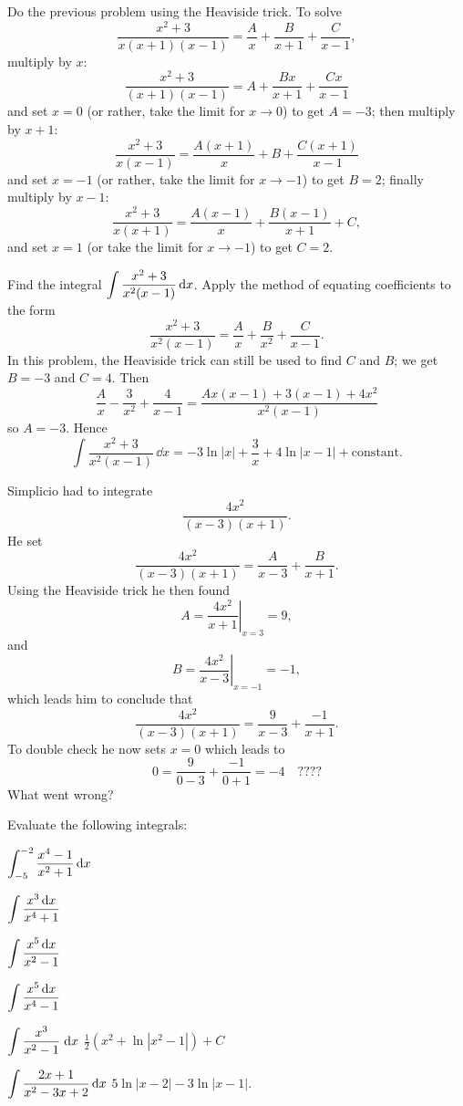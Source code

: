 \begin{multicols}{2}
\problem Do the previous problem using the Heaviside trick. %
\answer %
To solve
\[
\frac{x^2+3}{x(x+1)(x-1)} =
\frac{A}{x}+\frac{B}{x+1}+\frac{C}{x-1},
\]
multiply by $x$:
\[
\frac{x^2+3}{(x+1)(x-1)} = A+\frac{Bx}{x+1}+\frac{Cx}{x-1}
\]
and set $x=0$ (or rather, take the limit for $x\to0$)  to get $A=-3$; then multiply by $x+1$:
\[
\frac{x^2+3}{x(x-1)} = \frac{A(x+1)}{x}+B+\frac{C(x+1)}{x-1}
\]
and set $x=-1$
(or rather, take the limit for $x\to-1$) to get $B=2$; finally multiply by $x-1$:
\[
\frac{x^2+3}{x(x+1)} = \frac{A(x-1)}{x}+\frac{B(x-1)}{x+1}+ C,
\]
and set $x=1$ (or take the limit for $x\to-1$) to get $C=2$.
\endanswer

\problem\label{pblm:part-fracs-genrl} Find the integral $\DS %
\int\frac{x^2+3}{x^2(x-1)}\,\dd x$.
\answer %
Apply the method of equating coefficients to the form
\[
\frac{x^2+3}{x^2(x-1)}= \frac{A}{x}+\frac{B}{x^2}+\frac{C}{x-1}.
\]
In this problem, the Heaviside trick can still be used to find $C$
and $B$; we get $B=-3$ and $C=4$. Then
\[
\frac{A}{x}-\frac{3}{x^2}+\frac{4}{x-1}
=\frac{Ax(x-1)+3(x-1)+4x^2}{x^2(x-1)}
\]
so $A=-3$. Hence
\[
\int\frac{x^2+3}{x^2(x-1)}\,\dd x =-3\ln|x| +\frac{3}{x} +
4\ln|x-1| + \text{constant}.
\]
\endanswer

\problem Simplicio had to integrate %
\[
  \frac{4x^2}{(x-3)(x+1)}.
\]
He set
\[
\frac{4x^2}{(x-3)(x+1)} = \frac{A}{x-3} + \frac{B}{x+1}.
\]
Using the Heaviside trick he then found
\[
A = \left.\frac{4x^2}{x+1}\right|_{x=3} = 9,
\]
and 
\[
B =  \left.\frac{4x^2}{x-3}\right|_{x=-1} = -1,
\]
which leads him to conclude that 
\[
\frac{4x^2}{(x-3)(x+1)} = \frac{9}{x-3} + \frac{-1}{x+1}.
\]
To double check he now sets $x=0$ which leads to
\[
0 = \frac{9}{0-3} + \frac{-1}{0+1} = -4 \quad  ????
\]
What went wrong?


\begin{center}
  \textcolor{badgerred}{Evaluate the following integrals:}
\end{center}

\problem $\displaystyle \int^{-2}_{-5} \frac{x^4-1}{ x^2+1} \,\mathrm{d} x$ %

\problem $\displaystyle \int \frac{x^3\,\mathrm{d} x}{x^4+1}$ %

\problem $\displaystyle \int \frac{x^5\,\mathrm{d} x}{x^2-1}$ %

\problem $\displaystyle \int \frac{x^5\,\mathrm{d} x}{x^4-1}$ %


\problem $\displaystyle \int \frac{x^3}{x^2-1}\;\mathrm{d} x$ %
\answer %
$\frac12(x^2+\ln|x^2-1|)+C$
\endanswer

\problem $\displaystyle \int \frac{2x+1}{x^2-3x+2}\,\mathrm{d} x$ %
\answer %
$5\ln|x-2| -3 \ln|x-1|$.
\endanswer


\end{multicols}
